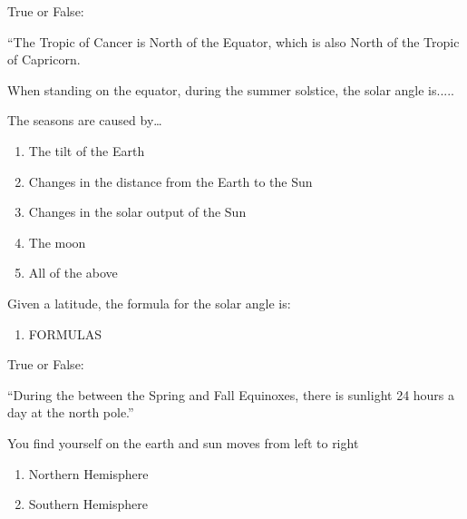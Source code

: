 \documentclass[noauthor,nooutcomes]{ximera}
\author{Bart Snapp}
\begin{document}
\maketitle


\begin{exercise}
  True or False:

  ``The Tropic of Cancer is North of the Equator, which is also North of the Tropic of Capricorn.
\end{exercise}


\begin{exercise}
  When standing on the equator, during the summer solstice, the solar angle is.....
\end{exercise}


\begin{exercise}
  The seasons are caused by\dots
\begin{enumerate}
  \item The tilt of the Earth
  \item Changes in the distance from the Earth to the Sun
  \item Changes in the solar output of the Sun
  \item The moon
  \item All of the above
\end{enumerate}
\end{exercise}



\begin{exercise}
  Given a latitude, the formula for the solar angle is:
  \begin{enumerate}
  \item FORMULAS
  \end{enumerate}
\end{exercise}


\begin{exercise}
  True or False:

  ``During the between the Spring and Fall Equinoxes, there is sunlight 24 hours a day at the north pole.''
\end{exercise}



\begin{exercise}
  You find yourself on the earth and sun moves from left to right
  \begin{enumerate}
  \item Northern Hemisphere
  \item Southern Hemisphere
  \end{enumerate}
\end{exercise}





\end{document}
